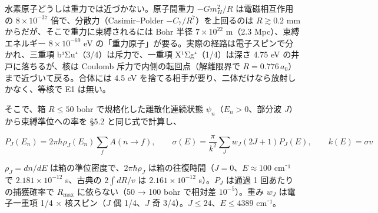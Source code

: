 \documentclass[
  a4paper,
]{ltjsarticle}
\begin{document}
水素原子どうしは重力では近づかない。原子間重力 \(-Gm_H^2/R\)
は電磁相互作用の \(8\times10^{-37}\) 倍で、分散力（Casimir--Polder
\(-C_7/R^7\)）を上回るのは \(R\gtrsim0.2\) mm
からだが、そこで重力に束縛されるには Bohr 半径 \(7\times10^{22}\) m（2.3
Mpc）、束縛エネルギー \(8\times10^{-69}\) eV
の「重力原子」が要る。実際の経路は電子スピンで分かれ、三重項
b³Σu⁺（3/4）は斥力で、一重項 X¹Σg⁺（1/4）は深さ 4.75 eV
の井戸に落ちるが、核は Coulomb 斥力で内側の転回点（解離限界で
\(R=0.776\,a_0\)）まで近づいて戻る。合体には 4.5 eV
を捨てる相手が要り、二体だけなら放射しかなく、等核で E1 は無い。

そこで、箱 \(R\le50\) bohr で規格化した離散化連続状態
\(\psi_n\)（\(E_n>0\)、部分波 \(J\)）から束縛準位への率を §5.2
と同じ式で計算し、

\[
P_J(E_n)=2\pi\hbar\rho_J(E_n)\sum_fA(n\to f),\qquad
\sigma(E)=\frac{\pi}{k^2}\sum_Jw_J(2J+1)P_J(E),\qquad k(E)=\sigma v
\]

\(\rho_J=dn/dE\) は箱の準位密度で、\(2\pi\hbar\rho_J\)
は箱の往復時間（\(J=0\)、\(E\approx100\) cm⁻¹ で \(2.181\times10^{-12}\)
s、古典の \(2\int dR/v\) は \(2.161\times10^{-12}\) s）。\(P_J\) は通過
1 回あたりの捕獲確率で \(R_{\max}\) に依らない（50 → 100 bohr で相対差
\(10^{-5}\)）。重み \(w_J\) は電子一重項 1/4 × 核スピン（\(J\) 偶
1/4、\(J\) 奇 3/4）。\(J\le24\)、\(E\le4389\) cm⁻¹。
\end{document}
